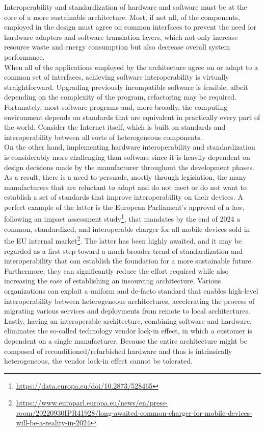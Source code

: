 Interoperability and standardization of hardware and software must be at the core
of a more sustainable architecture. Most, if not all, of the components, employed
in the design must agree on common interfaces to prevent the need for hardware adapters
and software translation layers, which not only increase resource waste and
energy consumption but also decrease overall system performance. \\ %
When all of the applications employed by the architecture agree on or adapt to a
common set of interfaces, achieving software interoperability is virtually straightforward.
Upgrading previously incompatible software is feasible, albeit depending on the complexity
of the program, refactoring may be required. Fortunately, most software programs
and, more broadly, the computing environment depends on standards that are
equivalent in practically every part of the world. Consider the Internet itself,
which is built on standards and interoperability between all sorts of
heterogeneous components. \\ %
On the other hand, implementing hardware interoperability and standardization is
considerably more challenging than software since it is heavily dependent on design
decisions made by the manufacturer throughout the development phases. As a
result, there is a need to persuade, mostly through legislation, the many manufacturers
that are reluctant to adapt and do not meet or do not want to establish a set of
standards that improve interoperability on their devices. A perfect example of
the latter is the European Parliament's approval of a law, following an impact assessment
study\footnote{\url{https://data.europa.eu/doi/10.2873/528465}}, that mandates
by the end of 2024 a common, standardized, and interoperable charger for all
mobile devices sold in the EU internal market\footnote{\url{https://www.europarl.europa.eu/news/en/press-room/20220930IPR41928/long-awaited-common-charger-for-mobile-devices-will-be-a-reality-in-2024}}.
The latter has been highly awaited, and it may be regarded as a first step
toward a much broader trend of standardization and interoperability that can
establish the foundation for a more sustainable future. \\ %
Furthermore, they can significantly reduce the effort required while also increasing
the ease of establishing an insourcing architecture. Various organizations can
exploit a uniform and de-facto standard that enables high-level interoperability
between heterogeneous architectures, accelerating the process of migrating various
services and deployments from remote to local architectures. \\ %
Lastly, having an interoperable architecture, combining software and hardware,
eliminates the so-called technology vendor lock-in effect, in which a customer is
dependent on a single manufacturer. Because the entire architecture might be
composed of reconditioned/refurbished hardware and thus is intrinsically
heterogeneous, the vendor lock-in effect cannot be tolerated. \\ %

